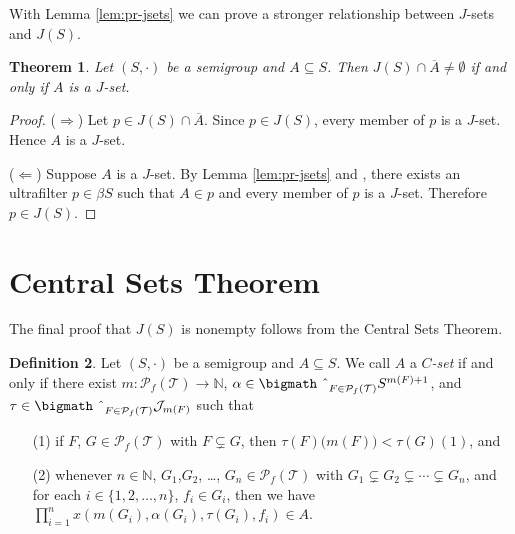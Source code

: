 \documentclass[12pt,showtrims]{memoir}
\theoremstyle{plain}
\newtheorem{thm}{Theorem}[section]
\theoremstyle{definition}
\newtheorem{defn}[thm]{Definition}
\newcommand{\bbN}{\mathbb{N}}
\newcommand{\calJ}{\mathcal{J}}
\newcommand{\calT}{\mathcal{T}}
\newcommand{\Pf}{\mathcal{P}_f}
\newcommand{\bigtimes}{\hbox{\bigmath \char'2}}
\begin{document}
With Lemma \ref{lem:pr-jsets} we can prove a stronger relationship between $J$-sets and $J(S)$.

\begin{thm}
  \label{thm:jsets-ideal}
  Let $(S, \cdot)$ be a semigroup and $A \subseteq S$.
  Then $J(S) \cap \overline{A} \ne \emptyset$ if and only if $A$ is a $J$-set.
\end{thm}
\begin{proof}
  ($\Rightarrow$)
  Let $p \in J(S) \cap \overline{A}$. 
  Since $p \in J(S)$, every member of $p$ is a $J$-set.
  Hence $A$ is a $J$-set.

  ($\Leftarrow$)
  Suppose $A$ is a $J$-set. 
  By Lemma \ref{lem:pr-jsets} and \cite[Theorem 3.11]{Hindman:1998fk}, there exists an ultrafilter $p \in \beta S$ such that $A \in p$ and every member of $p$ is a $J$-set. 
  Therefore $p \in J(S)$.
\end{proof}


\section{Central Sets Theorem}
The final proof that $J(S)$ is nonempty follows from the Central Sets Theorem.
\begin{defn}
  Let $(S, \cdot)$ be a semigroup and $A \subseteq S$.
  We call $A$ a \textsl{$C$-set} if and only if there exist $m \colon \Pf(\calT) \to \bbN$, $\alpha \in \bigtimes_{F \in \Pf(\calT)} S^{m(F)+1}$, and $\tau \in \bigtimes_{F \in \Pf(\calT)} \calJ_{m(F)}$ such that 
  \begin{itemize}
    \item[(1)] if $F$, $G \in \Pf(\calT)$ with $F \subsetneq G$, then $\tau(F)\bigl( m(F) \bigr) < \tau(G)(1)$, and
    \item[(2)] whenever $n \in \bbN$, $G_1$,$G_2$, \dots, $G_n \in \Pf(\calT)$  with $G_1 \subsetneq G_2 \subsetneq \cdots \subsetneq G_n$, and for each $i \in \{1, 2, \ldots, n\}$, $f_i \in G_i$, then we have $\prod_{i=1}^n x(m(G_i), \alpha(G_i), \tau(G_i), f_i) \in A$.
  \end{itemize}
\end{defn}
\end{document}
